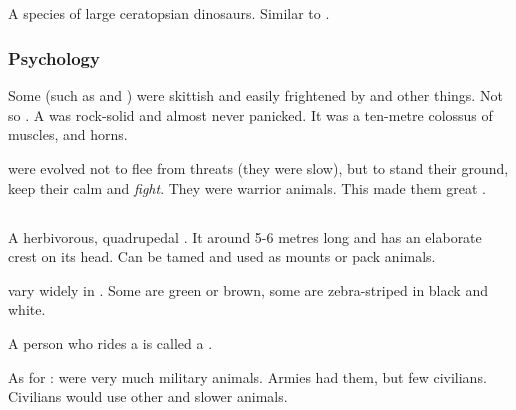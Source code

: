\subsection{\Mulgrons}
\index{\mulgron}
A species of large ceratopsian dinosaurs. Similar to .





\subsubsection{Psychology}
Some \saurians (such as  and ) were skittish and easily frightened by  and other things. 
Not so \murocs. 
A \muroc was rock-solid and almost never panicked. 
It was a ten-metre colossus of muscles, \armour and horns. 

\Murocs were evolved not to flee from threats (they were slow), but to stand their ground, keep their calm and \emph{fight}. 
They were warrior animals. 
This made them great . 















\subsection{\Relc}
A herbivorous, quadrupedal . 
It around 5-6 metres long and has an elaborate crest on its head. 
Can be tamed and used as mounts or pack animals. 

\Relcs{} vary widely in \colour. 
Some are green or brown, some are zebra-striped in black and white. 

A person who rides a \relc{} is called a \relcer{}. 

As for : 
\Relcs were very much military animals.
Armies had them, but few civilians. 
Civilians would use other and slower animals.






